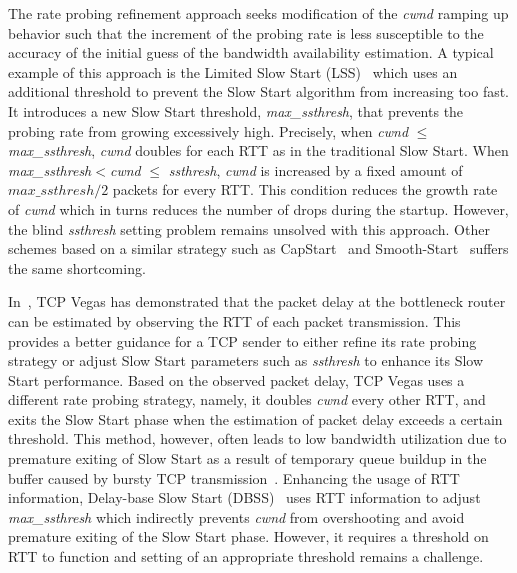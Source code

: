 \documentclass[12pt,onecolumn]{IEEEtran}
\begin{document}
The rate probing refinement approach seeks modification of the \emph{cwnd}
ramping up behavior such that the increment of the probing rate is less
susceptible to the accuracy of the initial guess of the bandwidth availability
estimation. A typical example of this approach is the Limited Slow Start
(LSS)~\cite{limited} which uses an additional threshold to prevent the Slow
Start algorithm from increasing too fast. It introduces a new Slow Start
threshold, \emph{max\_ssthresh}, that prevents the probing rate from growing
excessively high. Precisely, when \emph{cwnd} $\leq$ \emph{max\_ssthresh},
\emph{cwnd} doubles for each RTT as in the traditional Slow Start. When
\emph{max\_ssthresh}$<$\emph{cwnd} $\leq$ \emph{ssthresh}, \emph{cwnd} is
increased by a fixed amount of $max\_ssthresh/2$ packets for every RTT. This
condition reduces the growth rate of \emph{cwnd} which in turns reduces the
number of drops during the startup. However, the blind \emph{ssthresh} setting
problem remains unsolved with this approach. Other schemes based on a similar
strategy such as CapStart~\cite{capstart} and Smooth-Start~\cite{smoothstart1,
smoothstart2} suffers the same shortcoming.

In~\cite{vegas}, TCP Vegas has demonstrated that the packet delay at the
bottleneck router can be estimated by observing the RTT of each packet
transmission. This provides a better guidance for a TCP sender to either refine
its rate probing strategy or adjust Slow Start parameters such as
\emph{ssthresh} to enhance its Slow Start performance. Based on the observed
packet delay, TCP Vegas uses a different rate probing strategy, namely, it
doubles \emph{cwnd} every other RTT, and exits the Slow Start phase when the
estimation of packet delay exceeds a certain threshold. This method, however,
often leads to low bandwidth utilization due to premature exiting of Slow Start
as a result of temporary queue buildup in the buffer caused by bursty TCP
transmission~\cite{tcpw-a}. Enhancing the usage of RTT information, Delay-base Slow Start
(DBSS)~\cite{delaybased} uses RTT information to adjust \emph{max\_ssthresh}
which indirectly prevents \emph{cwnd} from overshooting and avoid premature
exiting of the Slow Start phase. However, it requires a threshold on RTT to
function and setting of an appropriate threshold remains a challenge. 
\begin{comment}
\footnote{Delay-base Slow Start (DBSS)~\cite{delaybased} uses observation of
the packet delay to address the \emph{max\_ssthresh} setting problem of LSS.
Specifically, It sets \emph{max\_ssthresh} to \emph{cwnd} when the observed RTT
exceeds a certain RTT threshold. However, the RTT threshold is set with regard
to the maximum RTT of a connection, which is unavailable during the first
startup. Other similar proposals such as Conservative Slow
Start~\cite{conservative} face the same problem as that of DBSS.}
\end{comment}
\end{document}
